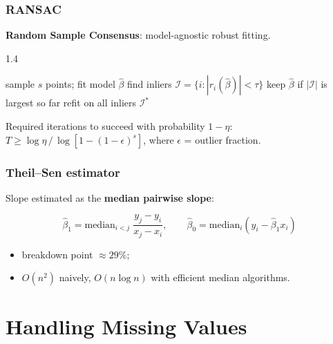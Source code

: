 \documentclass[]{beamer}
\begin{document}
\begin{frame}[fragile]
\frametitle{RANSAC}
\textbf{Random Sample Consensus}: model-agnostic robust fitting.

\begin{framed}
\begin{spacing}{1.4}
\begin{algorithmic}[1]
  \Repeat
    \State sample $s$ points; fit model $\hat{\beta}$
    \State find inliers $\mathcal{I} = \{i : |r_i(\hat{\beta})| < \tau\}$
    \State keep $\hat{\beta}$ if $|\mathcal{I}|$ is largest so far
  \State refit on all inliers $\mathcal{I}^*$
\end{algorithmic}
\end{spacing}
\end{framed}

Required iterations to succeed with probability $1-\eta$:
$T \geq \log\eta \,/\, \log[1-(1-\epsilon)^s]$, where $\epsilon$ = outlier fraction.

\end{frame}

\begin{frame}[fragile]
\frametitle{Theil--Sen estimator}
Slope estimated as the \textbf{median pairwise slope}:

\begin{equation*}
\hat{\beta}_1 = \mathrm{median}_{i < j}\; \frac{y_j - y_i}{x_j - x_i}, \qquad
\hat{\beta}_0 = \mathrm{median}_i(y_i - \hat{\beta}_1 x_i)
\end{equation*}

\begin{itemize}
  \item breakdown point $\approx 29\%$;
  \item $O(n^2)$ naively, $O(n\log n)$ with efficient median algorithms.
\end{itemize}

\end{frame}

\section{Handling Missing Values}
\end{document}
